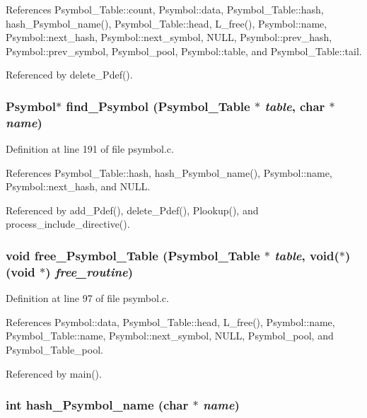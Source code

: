 References Psymbol\_\-Table::count, Psymbol::data, Psymbol\_\-Table::hash, hash\_\-Psymbol\_\-name(), Psymbol\_\-Table::head, L\_\-free(), Psymbol::name, Psymbol::next\_\-hash, Psymbol::next\_\-symbol, NULL, Psymbol::prev\_\-hash, Psymbol::prev\_\-symbol, Psymbol\_\-pool, Psymbol::table, and Psymbol\_\-Table::tail.

Referenced by delete\_\-Pdef().
\subsubsection{\setlength{\rightskip}{0pt plus 5cm}\bf{Psymbol}$\ast$ find\_\-Psymbol (\bf{Psymbol\_\-Table} $\ast$ {\em table}, char $\ast$ {\em name})}\label{psymbol_8c_dcef8f7f2490ff89644f958db15b07cd}




Definition at line 191 of file psymbol.c.

References Psymbol\_\-Table::hash, hash\_\-Psymbol\_\-name(), Psymbol::name, Psymbol::next\_\-hash, and NULL.

Referenced by add\_\-Pdef(), delete\_\-Pdef(), Plookup(), and process\_\-include\_\-directive().
\subsubsection{\setlength{\rightskip}{0pt plus 5cm}void free\_\-Psymbol\_\-Table (\bf{Psymbol\_\-Table} $\ast$ {\em table}, void($\ast$)(void $\ast$) {\em free\_\-routine})}\label{psymbol_8c_6d76093f228e49068b42c187a149e669}




Definition at line 97 of file psymbol.c.

References Psymbol::data, Psymbol\_\-Table::head, L\_\-free(), Psymbol::name, Psymbol\_\-Table::name, Psymbol::next\_\-symbol, NULL, Psymbol\_\-pool, and Psymbol\_\-Table\_\-pool.

Referenced by main().
\subsubsection{\setlength{\rightskip}{0pt plus 5cm}int hash\_\-Psymbol\_\-name (char $\ast$ {\em name})}\label{psymbol_8c_3eb26afb9e01015e862209de3eb019ff}




